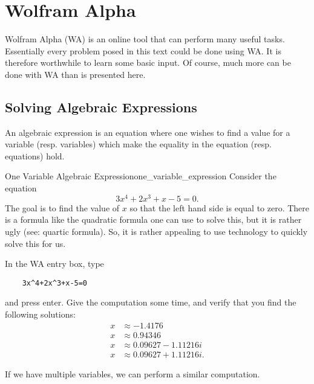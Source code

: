 \section{Wolfram Alpha}
Wolfram Alpha (WA) is an online tool that can perform many useful tasks.  Essentially every problem posed in this text could be done using WA.  It is therefore worthwhile to learn some basic input.  Of course, much more can be done with WA than is presented here.  

\subsection{Solving Algebraic Expressions}
An algebraic expression is an equation where one wishes to find a value for a variable (resp. variables) which make the equality in the equation (resp. equations) hold.  

\begin{ex}{One Variable Algebraic Expression}{one_variable_expression}
Consider the equation
\[
3x^4+2x^3+x-5=0.
\]
The goal is to find the value of $x$ so that the left hand side is equal to zero.  There is a formula like the quadratic formula one can use to solve this, but it is rather ugly (see: quartic formula). So, it is rather appealing to use technology to quickly solve this for us.

In the WA entry box, type

\begin{center}
\begin{BVerbatim}
    3x^4+2x^3+x-5=0
\end{BVerbatim}
\end{center}

and press enter.  Give the computation some time, and verify that you find the following solutions:
\begin{align*}
    x &\approx -1.4176\\
    x &\approx 0.94346\\
    x &\approx 0.09627 - 1.11216 i\\
    x &\approx 0.09627 + 1.11216 i.
\end{align*}
\end{ex}

If we have multiple variables, we can perform a similar computation.  

